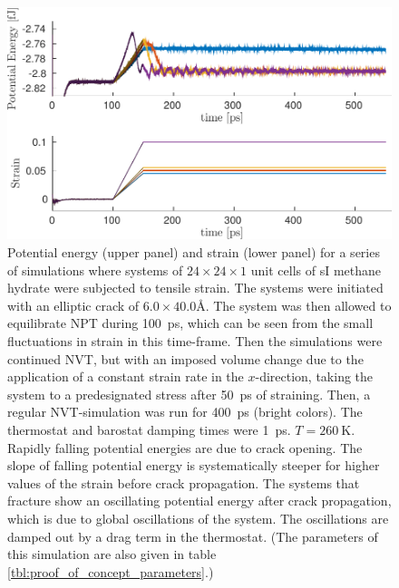 \begin{figure}
\includegraphics[width=\textwidth]{../figures/thesis/proof_of_concept_poteng_strain.pdf}
\caption{Potential energy (upper panel) and strain (lower panel) for a series of simulations where systems of $24\times 24\times 1$ unit cells of sI methane hydrate were subjected to tensile strain. The systems were initiated with an elliptic crack of $6.0 \times 40.0 \si{\angstrom}$. The system was then allowed to equilibrate NPT during \SI{100}{\pico\second}, which can be seen from the small fluctuations in strain in this time-frame. Then the simulations were continued NVT, but with an imposed volume change due to the application of a constant strain rate in the $x$-direction, taking the system to a predesignated stress after \SI{50}{\pico\second} of straining. Then, a regular NVT-simulation was run for \SI{400}{\pico\second} (bright colors). The thermostat and barostat damping times were \SI{1}{\pico\second}. $T=\SI{260}{\kelvin}$. Rapidly falling potential energies are due to crack opening. The slope of falling potential energy is systematically steeper for higher values of the strain before crack propagation. The systems that fracture show an oscillating potential energy after crack propagation, which is due to global oscillations of the system. The oscillations are damped out by a drag term in the thermostat. (The parameters of this simulation are also given in table \ref{tbl:proof_of_concept_parameters}.)}
\label{fig:proof_of_concept_crack}
\end{figure}

